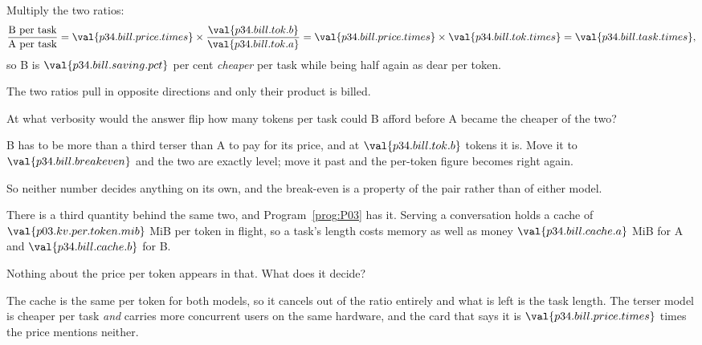 \begin{fr}
\begin{ansblock}
Multiply the two ratios:
\[ \frac{\text{B per task}}{\text{A per task}}
   = \val{p34.bill.price.times} \times
     \frac{\val{p34.bill.tok.b}}{\val{p34.bill.tok.a}}
   = \val{p34.bill.price.times} \times \val{p34.bill.tok.times}
   = \val{p34.bill.task.times} , \]
so B is $\val{p34.bill.saving.pct}$ per cent \emph{cheaper} per task while
being half again as dear per token.
\end{ansblock}

The two ratios pull in opposite directions and only their product is billed.

At what verbosity would the answer flip \dash{} how many tokens per task
could B afford before A became the cheaper of the two?
\dotline
\nextframe
\end{fr}

\begin{fr}

B has to be more than a third terser than A to pay for its price, and at
$\val{p34.bill.tok.b}$ tokens it is. Move it to
$\val{p34.bill.breakeven}$ and the two are exactly level; move it past and
the per-token figure becomes right again.

So neither number decides anything on its own, and the break-even is a
property of the pair rather than of either model.
\end{fr}

\begin{fr}
There is a third quantity behind the same two, and Program~\ref{prog:P03}
has it. Serving a conversation holds a cache of
$\val{p03.kv.per.token.mib}$ MiB per token in flight, so a task's length
costs memory as well as money \dash{} $\val{p34.bill.cache.a}$ MiB for A and
$\val{p34.bill.cache.b}$ for B.

Nothing about the price per token appears in that. What does it decide?
\dotline
\nextframe
\end{fr}

\begin{fr}

The cache is the same per token for both models, so it cancels out of the
ratio entirely and what is left is the task length. The terser model is
cheaper per task \emph{and} carries more concurrent users on the same
hardware, and the card that says it is
$\val{p34.bill.price.times}$ times the price mentions neither.
\end{fr}


